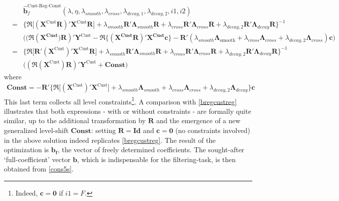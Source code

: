 \documentclass[a4paper]{book}
\begin{document}
\begin{eqnarray}\label{bregcustregconst}
&&\mathbf{\hat{b}}^{\textrm{Cust-Reg-Const}}_f(\lambda,\eta,\lambda_{{smooth}},\lambda_{{cross}},\lambda_{{decay},1},\lambda_{{decay},2},i1,i2)\nonumber\\
&=&\Big\{\Re\Big[(\mathbf{X}^{\textrm{Cust}}\mathbf{R})' \mathbf{X}^{\textrm{Cust}}\mathbf{R}\Big]+
\lambda_{{smooth}}\mathbf{R}'\boldsymbol{\Lambda}_{smooth}\mathbf{R}+\lambda_{{cross}}\mathbf{R}'\boldsymbol{\Lambda}_{cross}\mathbf{R}+\lambda_{{decay},2}\mathbf{R}'\boldsymbol{\Lambda}_{decay}\mathbf{R}
\Big\}^{-1}\nonumber\\
&&\Big((\Re(\mathbf{X^{\textrm{Cust}})R})'
\mathbf{Y}^{\textrm{Cust}}-\Re\bigg\{(\mathbf{X^{\textrm{Cust}}R})'\mathbf{X^{\textrm{Cust}}c}\bigg\}-
\mathbf{R}'(\lambda_{{smooth}}\boldsymbol{\Lambda}_{\textrm{smooth}}+\lambda_{{cross}}\boldsymbol{\Lambda}_{{cross}}+
\lambda_{{decay},2}\boldsymbol{\Lambda}_{{cross}})\mathbf{c}\Big)\nonumber\\
&=&\Big\{\Re\Big[\mathbf{R}'(\mathbf{X}^{\textrm{Cust} })' \mathbf{X}^{\textrm{Cust}}\mathbf{R}\Big]+
\lambda_{{smooth}}\mathbf{R}'\boldsymbol{\Lambda}_{{smooth}}\mathbf{R}+\lambda_{{cross}}\mathbf{R}'\boldsymbol{\Lambda}_{cross}\mathbf{R}+\lambda_{{decay},2}\mathbf{R}'\boldsymbol{\Lambda}_{decay}\mathbf{R}
\Big\}^{-1}\nonumber\\
&&\Big((\Re(\mathbf{X}^{\textrm{Cust}})\mathbf{R})'
\mathbf{Y}^{\textrm{Cust}}+\mathbf{Const}\Big)
\end{eqnarray}
where 
\begin{eqnarray*}
\mathbf{Const}=-\mathbf{R}'\Big\{\Re\Big[(\mathbf{X}^{\textrm{Cust}})'\mathbf{X}^{\textrm{Cust}}\Big]+
\lambda_{{smooth}}\boldsymbol{\Lambda}_{{smooth}}+\lambda_{{cross}}\boldsymbol{\Lambda}_{{cross}}+
\lambda_{{decay},2}\boldsymbol{\Lambda}_{{decay}}\Big\}\mathbf{c}
\end{eqnarray*}
This last term collects all level constraints\footnote{Indeed, $\mathbf{c=0}$ if $i1=F$.}. A comparison with \ref{bregcustreg} illustrates that both expressions - with or without constraints - are formally quite similar, up to the additional transformation by $\mathbf{R}$ and the emergence of a new generalized level-shift $\mathbf{Const}$: setting $\mathbf{R=Id}$ and $\mathbf{c=0}$ (no constraints involved) in the above solution indeed replicates  \ref{bregcustreg}. The result of the optimization is $\mathbf{b_f}$, the vector of freely determined coefficients. 
The sought-after `full-coefficient' vector $\mathbf{b}$, which is indispensable for the filtering-task, is then obtained from \ref{cons5s}.\\
\end{document}
